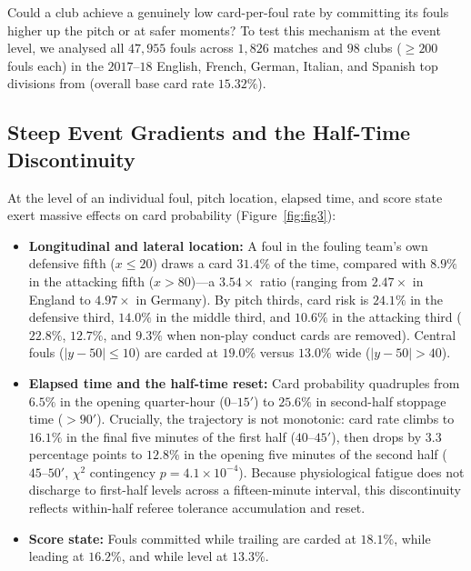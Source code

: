 \documentclass[10pt,twocolumn]{article}
\begin{document}
Could a club achieve a genuinely low card-per-foul rate by committing its fouls higher up the pitch or at safer moments? To test this mechanism at the event level, we analysed all $47,955$ fouls across $1,826$ matches and $98$ clubs ($\ge 200$ fouls each) in the $2017\text{--}18$ English, French, German, Italian, and Spanish top divisions from \citet{pappalardo2019events} (overall base card rate $15.32\%$).

\subsection{Steep Event Gradients and the Half-Time Discontinuity}
At the level of an individual foul, pitch location, elapsed time, and score state exert massive effects on card probability (Figure~\ref{fig:fig3}):
\begin{itemize}
  \item \textbf{Longitudinal and lateral location:} A foul in the fouling team's own defensive fifth ($x \le 20$) draws a card $\mathbf{31.4\%}$ of the time, compared with $\mathbf{8.9\%}$ in the attacking fifth ($x > 80$)---a $3.54\times$ ratio (ranging from $2.47\times$ in England to $4.97\times$ in Germany). By pitch thirds, card risk is $24.1\%$ in the defensive third, $14.0\%$ in the middle third, and $10.6\%$ in the attacking third ($22.8\%$, $12.7\%$, and $9.3\%$ when non-play conduct cards are removed). Central fouls ($|y - 50| \le 10$) are carded at $19.0\%$ versus $13.0\%$ wide ($|y - 50| > 40$).
  \item \textbf{Elapsed time and the half-time reset:} Card probability quadruples from $\mathbf{6.5\%}$ in the opening quarter-hour ($0\text{--}15'$) to $\mathbf{25.6\%}$ in second-half stoppage time ($>90'$). Crucially, the trajectory is not monotonic: card rate climbs to $\mathbf{16.1\%}$ in the final five minutes of the first half ($40\text{--}45'$), then drops by $\mathbf{3.3}$ percentage points to $\mathbf{12.8\%}$ in the opening five minutes of the second half ($45\text{--}50'$, $\chi^2$ contingency $p = 4.1\times 10^{-4}$). Because physiological fatigue does not discharge to first-half levels across a fifteen-minute interval, this discontinuity reflects within-half referee tolerance accumulation and reset.
  \item \textbf{Score state:} Fouls committed while trailing are carded at $\mathbf{18.1\%}$, while leading at $16.2\%$, and while level at $\mathbf{13.3\%}$.
\end{itemize}
\end{document}
